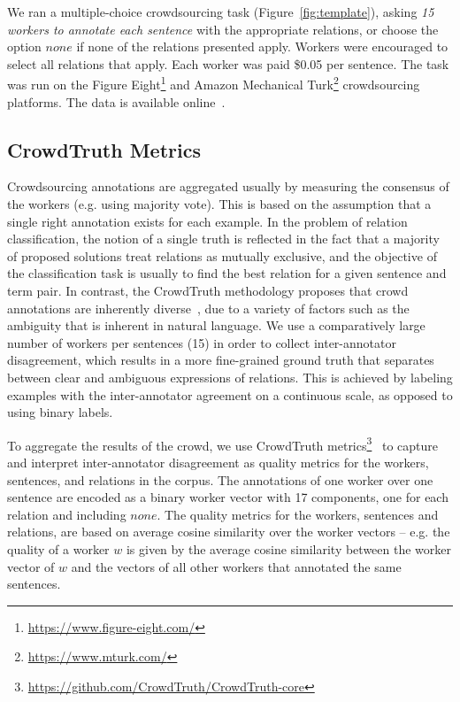 We ran a multiple-choice crowdsourcing task (Figure~\ref{fig:template}), asking {\em 15 workers to annotate each sentence} with the appropriate relations, or choose the option $none$ if none of the relations presented apply. Workers were encouraged to select all relations that apply. Each worker was paid \$0.05 per sentence. The task was run on the Figure Eight\footnote{\url{https://www.figure-eight.com/}} and Amazon Mechanical Turk\footnote{\url{https://www.mturk.com/}} crowdsourcing platforms. The data is available online~\cite{crowdODrelexdata2016}.


\subsection{CrowdTruth Metrics}
\label{sec:chap4_metrics}

Crowdsourcing annotations are aggregated usually by measuring the consensus of the workers (e.g. using majority vote). This is based on the assumption that a single right annotation exists for each example. In the problem of relation classification, the notion of a single truth is reflected in the fact that a majority of proposed solutions treat relations as mutually exclusive, and the objective of the classification task is usually to find the best relation for a given sentence and term pair. In contrast, the CrowdTruth methodology proposes that crowd annotations are inherently diverse~\cite{aroyo2015truth}, due to a variety of factors such as the ambiguity that is inherent in natural language. We use a comparatively large number of workers per sentences (15) in order to collect inter-annotator disagreement, which results in a more fine-grained ground truth that separates between clear and ambiguous expressions of relations. This is achieved by labeling examples with the inter-annotator agreement on a continuous scale, as opposed to using binary labels.

To aggregate the results of the crowd, we use CrowdTruth metrics\footnote{\url{https://github.com/CrowdTruth/CrowdTruth-core}}~\cite{dumitrache2018crowdtruth} to capture and interpret inter-annotator disagreement as quality metrics for the workers, sentences, and relations in the corpus. The annotations of one worker over one sentence are encoded as a binary worker vector with 17 components, one for each relation and including $none$. The quality metrics for the workers, sentences and relations, are based on average cosine similarity over the worker vectors --  e.g. the quality of a worker $w$ is given by the average cosine similarity between the worker vector of $w$ and the vectors of all other workers that annotated the same sentences.

